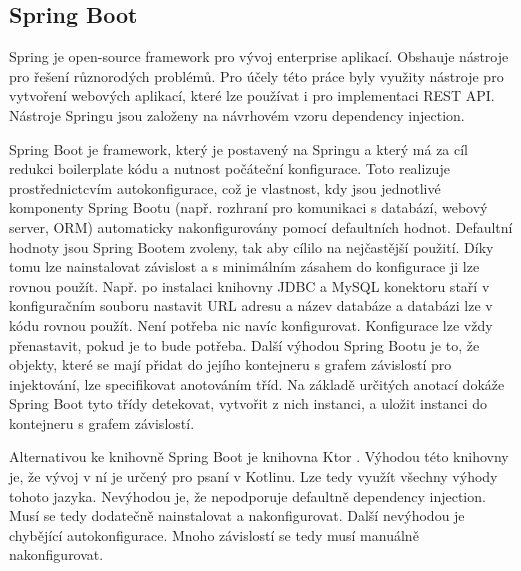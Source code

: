 \subsection*{Spring Boot}
Spring je open-source framework pro vývoj enterprise aplikací. Obshauje nástroje pro řešení různorodých problémů. Pro účely této práce byly využity nástroje pro vytvoření webových \linebreak aplikací, které lze používat i pro implementaci REST API. Nástroje Springu jsou založeny na návrhovém vzoru dependency injection.

Spring Boot je framework, který je postavený na Springu a který má za cíl redukci boilerplate kódu a nutnost počáteční konfigurace. Toto realizuje prostřednictcvím \linebreak autokonfigurace, což je vlastnost, kdy jsou jednotlivé komponenty Spring Bootu (např. rozhraní pro komunikaci s databází, webový server, ORM) automaticky nakonfigurovány pomocí defaultních hodnot. Defaultní hodnoty jsou Spring Bootem zvoleny, tak aby cílilo na nejčastější použití. Díky tomu lze nainstalovat závislost a s minimálním zásahem do konfigurace ji lze rovnou použít. Např. po instalaci knihovny JDBC a MySQL konektoru staří v konfiguračním souboru nastavit URL adresu a název databáze a databázi lze v kódu rovnou použít. Není potřeba nic navíc konfigurovat. Konfigurace lze vždy přenastavit, pokud je to bude potřeba. Další výhodou Spring Bootu je to, že objekty, které se mají přidat do jejího kontejneru s grafem závislostí pro injektování, lze specifikovat anotováním tříd. Na základě určitých anotací dokáže Spring Boot tyto třídy detekovat, vytvořit z nich instanci, a uložit instanci do kontejneru s grafem závislostí.

Alternativou ke knihovně Spring Boot je knihovna Ktor \cite{ktor}. Výhodou této knihovny je, že vývoj v ní je určený pro psaní v Kotlinu. Lze tedy využít všechny výhody tohoto jazyka. Nevýhodou je, že nepodporuje defaultně dependency injection. Musí se tedy dodatečně nainstalovat a nakonfigurovat. Další nevýhodou je chybějící autokonfigurace. Mnoho závislostí se tedy musí manuálně nakonfigurovat.


